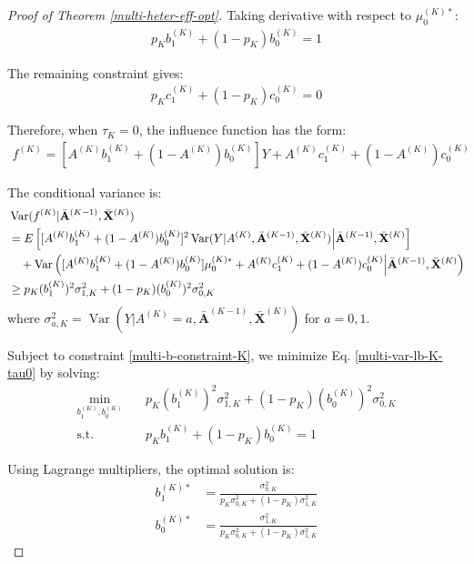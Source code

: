\documentclass[11pt]{article}
\theoremstyle{referenceplain}
\theoremstyle{referencedefinition}
\theoremstyle{referenceremark}
\begin{document}
\begin{proof}[Proof of Theorem \ref{multi-heter-eff-opt}]
Taking derivative with respect to $\mu_0^{(K)*}$:
\begin{align}\label{multi-b-constraint-K}
    p_K b_{1}^{(K)} + (1-p_K) b_{0}^{(K)} = 1
\end{align}

The remaining constraint gives:
\begin{align}\label{multi-c-constraint-K}
    p_K c_{1}^{(K)} + (1-p_K) c_{0}^{(K)} = 0
\end{align}

Therefore, when $\tau_K = 0$, the influence function has the form:
\begin{align}\label{multi-f-K-tau0}
    f^{(K)} = [A^{(K)} b_{1}^{(K)} + (1-A^{(K)}) b_{0}^{(K)}] Y + A^{(K)} c_{1}^{(K)} + (1-A^{(K)}) c_{0}^{(K)}
\end{align}

The conditional variance is:
\begin{align}
    &\operatorname{Var}(f^{(K)} | \bar{\mathbf{A}}^{(K-1)}, \bar{\mathbf{X}}^{(K)}) \notag\\
    &= E\left[[A^{(K)} b_{1}^{(K)} + (1-A^{(K)}) b_{0}^{(K)}]^2 \operatorname{Var}(Y | A^{(K)}, \bar{\mathbf{A}}^{(K-1)}, \bar{\mathbf{X}}^{(K)}) \Big| \bar{\mathbf{A}}^{(K-1)}, \bar{\mathbf{X}}^{(K)}\right] \notag\\
    &\quad + \operatorname{Var}\left([A^{(K)} b_{1}^{(K)} + (1-A^{(K)}) b_{0}^{(K)}] \mu_0^{(K)*} + A^{(K)} c_{1}^{(K)} + (1-A^{(K)}) c_{0}^{(K)} \Big| \bar{\mathbf{A}}^{(K-1)}, \bar{\mathbf{X}}^{(K)}\right) \notag\\
    &\geq p_K (b_{1}^{(K)})^2 \sigma_{1,K}^2 + (1-p_K) (b_{0}^{(K)})^2 \sigma_{0,K}^2 \label{multi-var-lb-K-tau0}
\end{align}
where $\sigma_{a,K}^2 = \operatorname{Var}(Y | A^{(K)} = a, \bar{\mathbf{A}}^{(K-1)}, \bar{\mathbf{X}}^{(K)})$ for $a = 0, 1$.

Subject to constraint \eqref{multi-b-constraint-K}, we minimize Eq. \eqref{multi-var-lb-K-tau0} by solving:
\begin{align*}
    \min_{b_{1}^{(K)}, b_{0}^{(K)}} \quad & p_K (b_{1}^{(K)})^2 \sigma_{1,K}^2 + (1-p_K) (b_{0}^{(K)})^2 \sigma_{0,K}^2 \\
    \text{s.t.} \quad & p_K b_{1}^{(K)} + (1-p_K) b_{0}^{(K)} = 1
\end{align*}

Using Lagrange multipliers, the optimal solution is:
\begin{align}
    b_{1}^{(K)*} &= \frac{\sigma_{0,K}^2}{p_K \sigma_{0,K}^2 + (1-p_K) \sigma_{1,K}^2} \label{multi-b1-K-opt}\\
    b_{0}^{(K)*} &= \frac{\sigma_{1,K}^2}{p_K \sigma_{0,K}^2 + (1-p_K) \sigma_{1,K}^2} \label{multi-b0-K-opt}
\end{align}


\end{proof}
\end{document}

